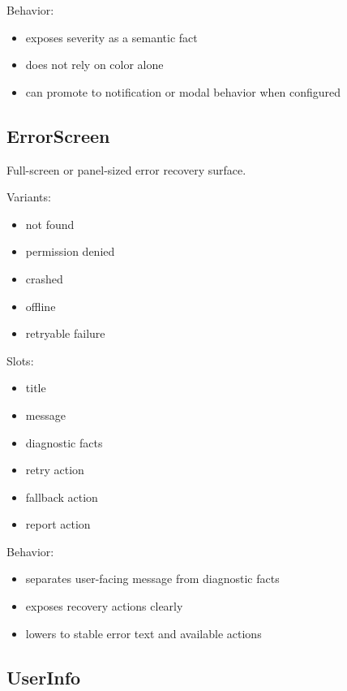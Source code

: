 Behavior:

\begin{itemize}
\tightlist
\item
  exposes severity as a semantic fact
\item
  does not rely on color alone
\item
  can promote to notification or modal behavior when configured
\end{itemize}

\subsection{ErrorScreen}\label{record-128-errorscreen}

Full-screen or panel-sized error recovery surface.

Variants:

\begin{itemize}
\tightlist
\item
  not found
\item
  permission denied
\item
  crashed
\item
  offline
\item
  retryable failure
\end{itemize}

Slots:

\begin{itemize}
\tightlist
\item
  title
\item
  message
\item
  diagnostic facts
\item
  retry action
\item
  fallback action
\item
  report action
\end{itemize}

Behavior:

\begin{itemize}
\tightlist
\item
  separates user-facing message from diagnostic facts
\item
  exposes recovery actions clearly
\item
  lowers to stable error text and available actions
\end{itemize}

\subsection{UserInfo}\label{record-128-userinfo}

